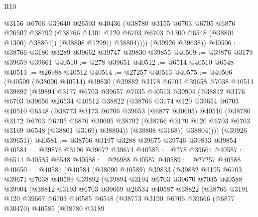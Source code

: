 \begin{lexlean}{R10}
\begin{coremodule}
                @3156
                @6706
                @39640
                @26503
                @40436
                (@38780
                  @3155
                  @6703
                  @6705
                  @6876
                  @26502
                  @38792
                  (@38766 @1301 @120 @6703 @6703 @1300 @6548 (@38801 @1300) @38804))
                (@38808 @1299))
              @38804))))
      (@39926 @39638))
@40506 := @38766 @3180 @3289 @39662 @39747 @39830 @39855
@40509 := @39876 @3179 @39659 @39661
@40510 := @278 @39651
@40512 := @6514 @40510 @6548
@40513 := @26988 @40512
@40514 := @27257 @40513
@40575 := @40506
    (@40509
      (@38090 @40514)
      @39830
      (@39882
        @3178
        @6703
        @39658
        @7038
        @40514
        @39892
        (@39894
          @3177
          @6703
          @39657
          @7035
          @40513
          @39904
          (@38812
            @3176
            @6703
            @39656
            @26534
            @40512
            @38822
            (@38766
              @3174
              @120
              @39654
              @6703
              @40510
              @6548
              (@38773
                @3173
                @6706
                @39653
                (@6877 @30605)
                @40510
                (@38780
                  @3172
                  @6703
                  @6705
                  @6876
                  @30605
                  @38792
                  (@38766 @3170 @120 @6703 @6703 @3169 @6548 (@38801 @3169) @38804))
                (@38808 @3168))
              @38804))))
      (@39926 @39651))
@40581 := @38766 @3197 @3288 @39675 @39746 @39833 @39854
@40584 := @39876 @3196 @39672 @39674
@40585 := @278 @39664
@40587 := @6514 @40585 @6548
@40588 := @26988 @40587
@40589 := @27257 @40588
@40650 := @40581
    (@40584
      (@38090 @40589)
      @39833
      (@39882
        @3195
        @6703
        @39671
        @7038
        @40589
        @39892
        (@39894
          @3194
          @6703
          @39670
          @7035
          @40588
          @39904
          (@38812
            @3193
            @6703
            @39669
            @26534
            @40587
            @38822
            (@38766
              @3191
              @120
              @39667
              @6703
              @40585
              @6548
              (@38773
                @3190
                @6706
                @39666
                (@6877 @30470)
                @40585
                (@38780
                  @3189

\end{coremodule}
\end{lexlean}
